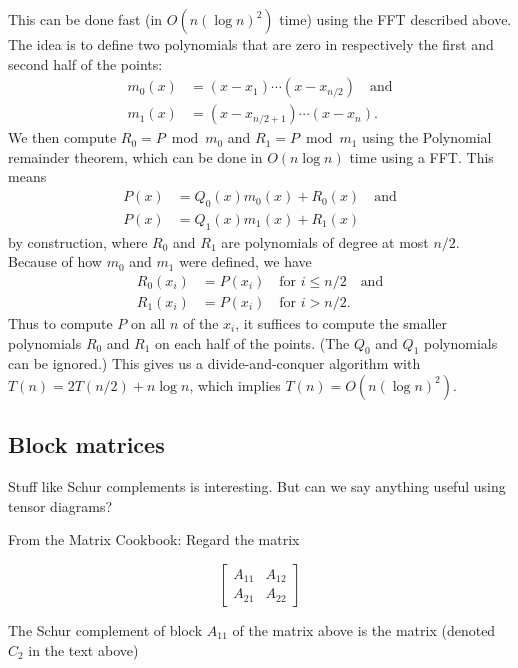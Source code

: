 This can be done fast (in $O(n(\log n)^2)$ time) using the FFT described above.
The idea is to define two polynomials that are zero in respectively the first and second half of the points:
\begin{align*}
   m_0(x)&=(x-x_1)\cdots(x-x_{n/2}) \quad\text{and}\\
   m_1(x)&=(x-x_{n/2+1})\cdots(x-x_{n}).
\end{align*}
We then compute $R_0 = P \bmod m_0$ and $R_1 = P \bmod m_1$ using the Polynomial remainder theorem, which can be done in $O(n\log n)$ time using a FFT.
This means
\begin{align*}
   P(x) &= Q_0(x)m_0(x) + R_0(x) \quad\text{and}\\
   P(x) &= Q_1(x)m_1(x) + R_1(x)
\end{align*}
by construction, where $R_0$ and $R_1$ are polynomials of degree at most $n/2$.
Because of how $m_0$ and $m_1$ were defined, we have
\begin{align*}
R_0(x_i) &= P(x_i) \quad\text{for } i \le n/2 \quad\text{and}\\
R_1(x_i) &= P(x_i) \quad\text{for } i > n/2.
\end{align*}
Thus to compute $P$ on all $n$ of the $x_i$, it suffices to compute the smaller polynomials $R_0$ and $R_1$ on each half of the points.
(The $Q_0$ and $Q_1$ polynomials can be ignored.)
This gives us a divide-and-conquer algorithm with $T(n) = 2T(n/2) + n\log n$, which implies $T(n)=O(n(\log n)^2)$.



\subsection{Block matrices}
Stuff like Schur complements is interesting.
But can we say anything useful using tensor diagrams?

From the Matrix Cookbook:
Regard the matrix

\[
   \left[ \begin{array}{c|c} A_{11} & A_{12} \\ \hline A_{21} & A_{22} \end{array} \right]
\]

The Schur complement of block $A_{11}$ of the matrix above is the matrix (denoted $C_2$ in the text above)

